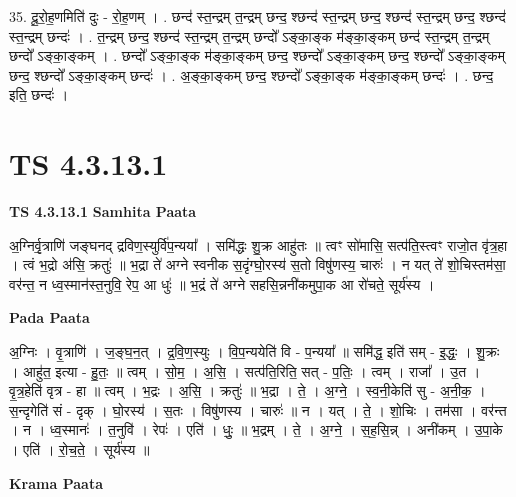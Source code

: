 \documentclass[17pt]{extarticle}
\begin{document}
35. दू॒रो॒ह॒णमिति॑ दुः - रो॒ह॒णम् । . छन्द॑ स्त॒न्द्रम् त॒न्द्रम् छन्द॒ श्छन्द॑ स्त॒न्द्रम् छन्द॒ श्छन्द॑ स्त॒न्द्रम् छन्द॒ श्छन्द॑ स्त॒न्द्रम् छन्दः॑ । . त॒न्द्रम् छन्द॒ श्छन्द॑ स्त॒न्द्रम् त॒न्द्रम् छन्दो᳚ ऽङ्का॒ङ्क म॑ङ्का॒ङ्कम् छन्द॑ स्त॒न्द्रम् त॒न्द्रम् छन्दो᳚ ऽङ्का॒ङ्कम् । . छन्दो᳚ ऽङ्का॒ङ्क म॑ङ्का॒ङ्कम् छन्द॒ श्छन्दो᳚ ऽङ्का॒ङ्कम् छन्द॒ श्छन्दो᳚ ऽङ्का॒ङ्कम् छन्द॒ श्छन्दो᳚ ऽङ्का॒ङ्कम् छन्दः॑ । . अ॒ङ्का॒ङ्कम् छन्द॒ श्छन्दो᳚ ऽङ्का॒ङ्क म॑ङ्का॒ङ्कम् छन्दः॑ । . छन्द॒ इति॒ छन्दः॑ । \newline
\pagebreak
{}

\section{ TS 4.3.13.1 }

\textbf{TS 4.3.13.1 } \newline
\textbf{Samhita Paata} \newline

अ॒ग्निर्वृ॒त्राणि॑ जङ्घनद् द्रविण॒स्युर्वि॑प॒न्यया᳚ । समि॑द्धः शु॒क्र आहु॑तः ॥ त्वꣳ सो॑मासि॒ सत्प॑ति॒स्त्वꣳ राजो॒त वृ॑त्र॒हा । त्वं भ॒द्रो अ॑सि॒ क्रतुः॑ ॥ भ॒द्रा ते॑ अग्ने स्वनीक स॒दृंग्घो॒रस्य॑ स॒तो विषु॑णस्य॒ चारुः॑ । न यत् ते॑ शो॒चिस्तम॑सा॒ वर॑न्त॒ न ध्व॒स्मान॑स्त॒नुवि॒ रेप॒ आ धुः॑ ॥ भ॒द्रं ते॑ अग्ने सहसि॒न्ननी॑कमुपा॒क आ रो॑चते॒ सूर्य॑स्य । \newline

\textbf{Pada Paata} \newline

अ॒ग्निः । वृ॒त्राणि॑ । ज॒ङ्घ॒न॒त् । द्र॒वि॒ण॒स्युः । वि॒प॒न्ययेति॑ वि - प॒न्यया᳚ ॥ समि॑द्ध॒ इति॑ सम् - इ॒द्धः॒ । शु॒क्रः । आहु॑त॒ इत्या - हु॒तः॒ ॥ त्वम् । सो॒म॒ । अ॒सि॒ । सत्प॑ति॒रिति॒ सत् - प॒तिः॒ । त्वम् । राजा᳚ । उ॒त । वृ॒त्र॒हेति॑ वृत्र - हा ॥ त्वम् । भ॒द्रः । अ॒सि॒ । क्रतुः॑ ॥ भ॒द्रा । ते॒ । अ॒ग्ने॒ । स्व॒नी॒केति॑ सु - अ॒नी॒क॒ । स॒न्दृगेति॑ सं - दृक् । घो॒रस्य॑ । स॒तः । विषु॑णस्य । चारुः॑ ॥ न । यत् । ते॒ । शो॒चिः । तम॑सा । वर॑न्त । न । ध्व॒स्मानः॑ । त॒नुवि॑ । रेपः॑ । एति॑ । धुः॒ ॥ भ॒द्रम् । ते॒ । अ॒ग्ने॒ । स॒ह॒सि॒न्न् । अनी॑कम् । उ॒पा॒के । एति॑ । रो॒च॒ते॒ । सूर्य॑स्य ॥  \newline


\textbf{Krama Paata} \newline
\end{document}
